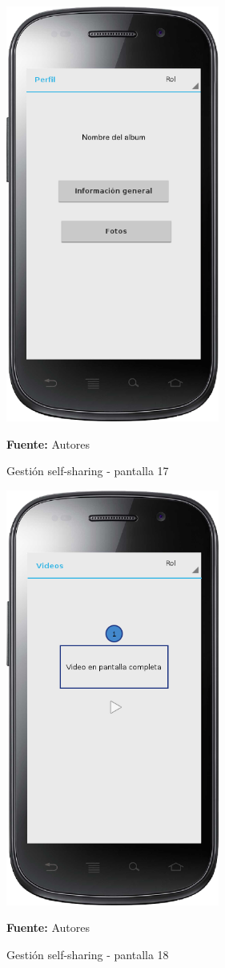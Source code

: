 \begin{figure}[!htb]
  \begin{center}
    \includegraphics[width=7cm]{./imagenes/UI/Self_sharing/self_sharing_17.png}
    \caption{Gestión self-sharing - pantalla 17}
    \label{fig:self_sharing_17}
    \textbf{Fuente:}  Autores
  \end{center}
\end{figure}

\begin{figure}[!htb]
  \begin{center}
    \includegraphics[width=7cm]{./imagenes/UI/Self_sharing/self_sharing_18.png}
    \caption{Gestión self-sharing - pantalla 18}
    \label{fig:self_sharing_18}
    \textbf{Fuente:}  Autores
  \end{center}
\end{figure}